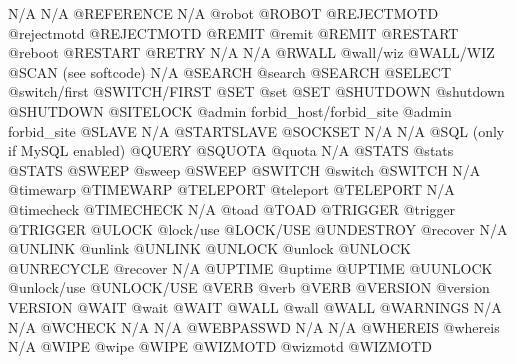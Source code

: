 \documentclass[letterpaper,10pt,english]{sphinxmanual}
\begin{document}
\begin{description}
N/A                     N/A                            @REFERENCE
N/A                     @robot                         @ROBOT
@REJECTMOTD             @rejectmotd                    @REJECTMOTD
@REMIT                  @remit                         @REMIT
@RESTART                @reboot                        @RESTART
@RETRY                  N/A                            N/A
@RWALL                  @wall/wiz                      @WALL/WIZ
@SCAN                   (see softcode)                 N/A
@SEARCH                 @search                        @SEARCH
@SELECT                 @switch/first                  @SWITCH/FIRST
@SET                    @set                           @SET
@SHUTDOWN               @shutdown                      @SHUTDOWN
@SITELOCK               @admin forbid\_host/forbid\_site @admin forbid\_site
@SLAVE                  N/A                            @STARTSLAVE
@SOCKSET                N/A                            N/A
@SQL                    (only if MySQL enabled)        @QUERY
@SQUOTA                 @quota                         N/A
@STATS                  @stats                         @STATS
@SWEEP                  @sweep                         @SWEEP
@SWITCH                 @switch                        @SWITCH
N/A                     @timewarp                      @TIMEWARP
@TELEPORT               @teleport                      @TELEPORT
N/A                     @timecheck                     @TIMECHECK
N/A                     @toad                          @TOAD
@TRIGGER                @trigger                       @TRIGGER
@ULOCK                  @lock/use                      @LOCK/USE
@UNDESTROY              @recover                       N/A
@UNLINK                 @unlink                        @UNLINK
@UNLOCK                 @unlock                        @UNLOCK
@UNRECYCLE              @recover                       N/A
@UPTIME                 @uptime                        @UPTIME
@UUNLOCK                @unlock/use                    @UNLOCK/USE
@VERB                   @verb                          @VERB
@VERSION                @version                       VERSION
@WAIT                   @wait                          @WAIT
@WALL                   @wall                          @WALL
@WARNINGS               N/A                            N/A
@WCHECK                 N/A                            N/A
@WEBPASSWD              N/A                            N/A
@WHEREIS                @whereis                       N/A
@WIPE                   @wipe                          @WIPE
@WIZMOTD                @wizmotd                       @WIZMOTD

\end{description}
\end{document}
